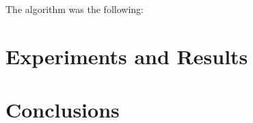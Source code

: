 \documentclass[runningheads]{llncs}
\begin{document}
The algorithm was the following:



\section{Experiments and Results}
\section{Conclusions}

%
%
%
%
%
% 
% 
%










\end{document}
